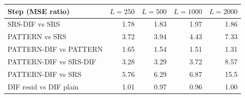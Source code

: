 \begin{tabular}{lrrrr}\toprule
Step (MSE ratio) & $L=250$ & $L=500$ & $L=1000$ & $L=2000$ \\\midrule
SRS-DIF vs SRS & 1.78 & 1.83 & 1.97 & 1.86 \\
PATTERN vs SRS & 3.72 & 3.94 & 4.43 & 7.33 \\
PATTERN-DIF vs PATTERN & 1.65 & 1.54 & 1.51 & 1.31 \\
PATTERN-DIF vs SRS-DIF & 3.28 & 3.29 & 3.72 & 8.57 \\
PATTERN-DIF vs SRS & 5.76 & 6.29 & 6.87 & 15.5 \\
DIF resid vs DIF plain & 1.01 & 0.97 & 0.96 & 1.00 \\
\bottomrule\end{tabular}

